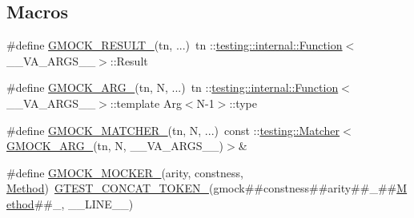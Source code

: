 \subsection*{Macros}
\begin{DoxyCompactItemize}
\item 
\#define \mbox{\hyperlink{googletest-master_2googlemock_2include_2gmock_2gmock-generated-function-mockers_8h_a0e9d94e9c77df84f1103af06feee1077}{G\+M\+O\+C\+K\+\_\+\+R\+E\+S\+U\+L\+T\+\_\+}}(tn, ...)~tn \+::\mbox{\hyperlink{structtesting_1_1internal_1_1_function}{testing\+::internal\+::\+Function}}$<$\+\_\+\+\_\+\+V\+A\+\_\+\+A\+R\+G\+S\+\_\+\+\_\+$>$\+::Result
\item 
\#define \mbox{\hyperlink{googletest-master_2googlemock_2include_2gmock_2gmock-generated-function-mockers_8h_a887575cc1c31158fba808180a10c004f}{G\+M\+O\+C\+K\+\_\+\+A\+R\+G\+\_\+}}(tn,  N, ...)~tn \+::\mbox{\hyperlink{structtesting_1_1internal_1_1_function}{testing\+::internal\+::\+Function}}$<$\+\_\+\+\_\+\+V\+A\+\_\+\+A\+R\+G\+S\+\_\+\+\_\+$>$\+::template Arg$<$N-\/1$>$\+::type
\item 
\#define \mbox{\hyperlink{googletest-master_2googlemock_2include_2gmock_2gmock-generated-function-mockers_8h_aa87d0009fe91f1c89d658776b55a769c}{G\+M\+O\+C\+K\+\_\+\+M\+A\+T\+C\+H\+E\+R\+\_\+}}(tn,  N, ...)~const \+::\mbox{\hyperlink{classtesting_1_1_matcher}{testing\+::\+Matcher}}$<$\mbox{\hyperlink{_obj__test_2lib_2googletest-release-1_88_81_2googlemock_2include_2gmock_2gmock-generated-function-mockers_8h_a887575cc1c31158fba808180a10c004f}{G\+M\+O\+C\+K\+\_\+\+A\+R\+G\+\_\+}}(tn, N, \+\_\+\+\_\+\+V\+A\+\_\+\+A\+R\+G\+S\+\_\+\+\_\+)$>$\&
\item 
\#define \mbox{\hyperlink{googletest-master_2googlemock_2include_2gmock_2gmock-generated-function-mockers_8h_a7d362499e27b1bc3a9806dd3cf58a5b7}{G\+M\+O\+C\+K\+\_\+\+M\+O\+C\+K\+E\+R\+\_\+}}(arity,  constness,  \mbox{\hyperlink{_obj__test_2lib_2googletest-release-1_88_81_2googlemock_2test_2gmock-spec-builders__test_8cc_a95606368148f3e5aab5db46c32466afd}{Method}})~\mbox{\hyperlink{_obj__test_2lib_2googletest-release-1_88_81_2googletest_2include_2gtest_2internal_2gtest-internal_8h_ae3c336cbe1ae2bd1b1d019333e4428a0}{G\+T\+E\+S\+T\+\_\+\+C\+O\+N\+C\+A\+T\+\_\+\+T\+O\+K\+E\+N\+\_\+}}(gmock\#\#constness\#\#arity\#\#\+\_\+\#\#\mbox{\hyperlink{_obj__test_2lib_2googletest-release-1_88_81_2googlemock_2test_2gmock-spec-builders__test_8cc_a95606368148f3e5aab5db46c32466afd}{Method}}\#\#\+\_\+, \+\_\+\+\_\+\+L\+I\+N\+E\+\_\+\+\_\+)
\item 

\end{DoxyCompactItemize}
